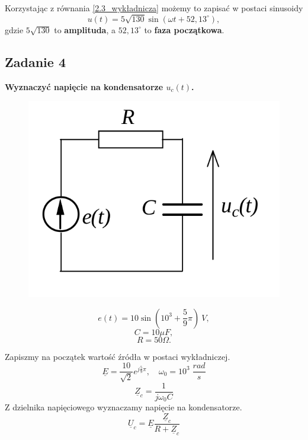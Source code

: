 \documentclass[12pt, a4paper]{article}
\begin{document}
Korzystając z równania \ref{2.3_wykładnicza} możemy to zapisać w postaci
sinusoidy
$$
  u(t) = 5\sqrt{130}\sin\left(\omega t+ 52,13^\circ\right),
$$
gdzie $5\sqrt{130}$ to \textbf{amplituda}, a $52,13^\circ$ to \textbf{faza
  początkowa}.

\subsection{Zadanie 4}
\textbf{Wyznaczyć napięcie na kondensatorze $u_c(t)$.}\\
\begin{minipage}{0.4\textwidth}
  \begin{figure}[H]
    \centering
    \includegraphics[width = \textwidth]{./images/Lista_2/Zadanie_4.png}
  \end{figure}
\end{minipage}
\hspace*{0.5cm}
\begin{minipage}{0.4\textwidth}
  $$
    e(t) = 10\sin\left(10^3+\dfrac{5}{9}\pi\right)\: V,
  $$
  $$
    C = 10 \mu F,
  $$
  $$
    R = 50 \Omega.
  $$
\end{minipage}

Zapiszmy na początek wartość źródła w postaci wykładniczej.
$$
  \underline{E}=\frac{10}{\sqrt{2}}e^{j\frac{5}{9}\pi}, \quad
  \omega_0 = 10^3\; \frac{rad}{s}
$$
\begin{equation}\label{2.4_impedancja}
  \underline{Z}_c = \frac{1}{j\omega_0 C}
\end{equation}
Z dzielnika napięciowego wyznaczamy napięcie na kondensatorze.
\begin{equation}\label{2.4_napiecieDzielnik}
  \underline{U}_c = \underline{E}\frac{\underline{Z}_c}{R+\underline{Z}_c}
\end{equation}
\end{document}
